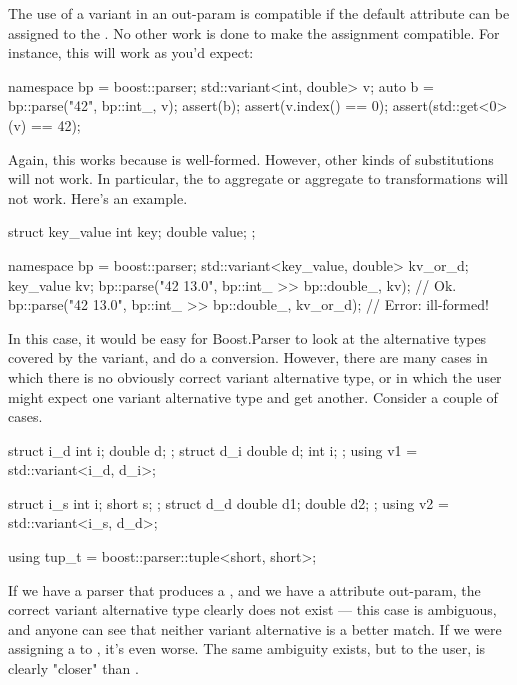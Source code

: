 \documentclass{MyBook}
\begin{document}
The use of a variant in an out-param is compatible if the default attribute can be assigned to the . No other work is done to make the assignment compatible. For instance, this will work as you'd expect:

\begin{code}
namespace bp = boost::parser;
std::variant<int, double> v;
auto b = bp::parse("42", bp::int_, v);
assert(b);
assert(v.index() == 0);
assert(std::get<0>(v) == 42);
\end{code}

Again, this works because  is well-formed. However, other kinds of substitutions will not work. In particular, the  to aggregate or aggregate to  transformations will not work. Here's an example.

\begin{code}
struct key_value
{
    int key;
    double value;
};

namespace bp = boost::parser;
std::variant<key_value, double> kv_or_d;
key_value kv;
bp::parse("42 13.0", bp::int_ >> bp::double_, kv);      // Ok.
bp::parse("42 13.0", bp::int_ >> bp::double_, kv_or_d); // Error: ill-formed!
\end{code}

In this case, it would be easy for Boost.Parser to look at the alternative types covered by the variant, and do a conversion. However, there are many cases in which there is no obviously correct variant alternative type, or in which the user might expect one variant alternative type and get another. Consider a couple of cases.

\begin{code}
struct i_d { int i; double d; };
struct d_i { double d; int i; };
using v1 = std::variant<i_d, d_i>;

struct i_s { int i; short s; };
struct d_d { double d1; double d2; };
using v2 = std::variant<i_s, d_d>;

using tup_t = boost::parser::tuple<short, short>;
\end{code}

If we have a parser that produces a , and we have a  attribute out-param, the correct variant alternative type clearly does not exist --- this case is ambiguous, and anyone can see that neither variant alternative is a better match. If we were assigning a  to , it's even worse. The same ambiguity exists, but to the user,  is clearly "closer" than .
\end{document}

